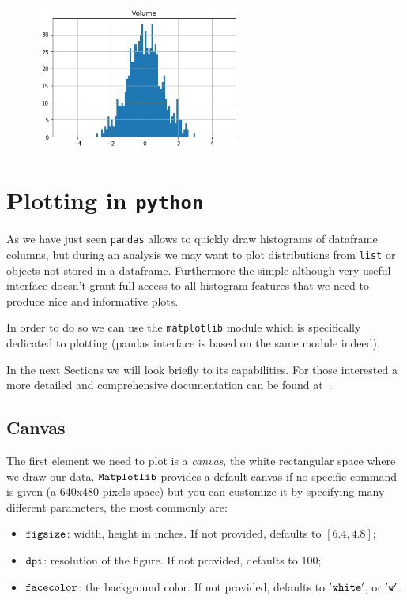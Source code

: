 \begin{figure}[h]
\centering
  \includegraphics[width=0.6\textwidth]{figures/Untitled_41_1.png}
\end{figure}
    
\clearpage
\section{Plotting in \texttt{python}}\label{plotting-in-python}

As we have just seen \texttt{pandas} allows to quickly draw histograms of dataframe columns, but during an analysis we may want to plot distributions from \texttt{list} or objects not stored in a dataframe. Furthermore the simple although very useful interface doesn't grant full access to all histogram features that we need to produce nice and informative plots.

In order to do so we can use the \texttt{matplotlib} module which is specifically dedicated to plotting (pandas interface is based on the same module indeed). 

In the next Sections we will look briefly to its capabilities. For those interested a more detailed and comprehensive documentation can be found at~\cite{matplotlib}.

\subsection{Canvas}\label{canvas}

The first element we need to plot is a \emph{canvas}, the white
rectangular space where we draw our data. \(\tt{Matplotlib}\) provides a
default canvas if no specific command is given (a 640x480 pixels space)
but you can customize it by specifying many different parameters, the
most commonly are:

\begin{itemize}
	\tightlist
	\item
	\(\tt{figsize}\): width, height in inches. If not provided, defaults
	to \([6.4, 4.8]\);
	\item
	\(\tt{dpi}\): resolution of the figure. If not provided, defaults to
	100;
	\item
	\(\tt{facecolor}\): the background color. If not provided, defaults to
	\(\tt{'white'}\), or \(\tt{'w'}\).
\end{itemize}

